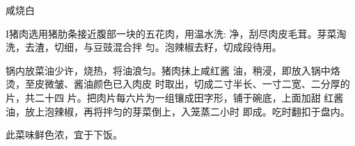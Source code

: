 \begin{recipe}{咸烧白}

\ingredients


\cooking

I猪肉选用猪肋条接近腹部一块的五花肉，用温水洗: 净，刮尽肉皮毛茸。芽菜淘洗，去渣，切细，与豆豉混合拌 匀。泡辣椒去籽，切成段待用。

\step 锅内放菜油少许，烧热，将油浪匀。猪肉抹上咸红酱 油，稍浸，即放入锅中烙烫，至皮微皱、酱油颜色已入肉皮 时取出，切成二寸半长、一寸二宽、二分厚的片，共二十四 片。把肉片每六片为一组镶成田字形，铺于碗底，上面加甜 红酱油，放上泡辣椒，再将拌匀的芽菜倒上，入笼蒸二小时 即成。吃时翻扣于盘内。

\notes

此菜味鲜色浓，宜于下饭。

\end{recipe}

